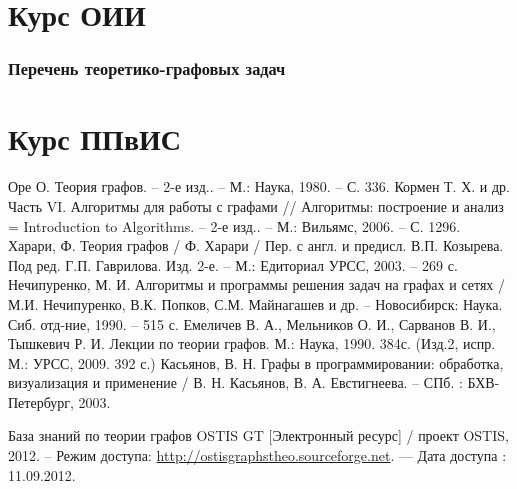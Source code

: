 \documentclass[a4paper,12pt]{report}
\begin{document}

\tableofcontents

\part{Курс ОИИ}


\clearpage

{}
\section*{Перечень теоретико-графовых задач}
\label{sec:tasks_list}






\part{Курс ППвИС}






\newpage 
\begin{thebibliography}{99}

 Оре О. Теория графов. -- 2-е изд.. -- М.: Наука,
  1980. -- С. 336.
 Кормен Т. Х. и др. Часть VI. Алгоритмы для
  работы с графами // Алгоритмы: построение и анализ = Introduction to
  Algorithms. -- 2-е изд.. -- М.: Вильямс, 2006. -- С. 1296.
 Харари, Ф. Теория графов / Ф. Харари / Пер. с
  англ. и предисл. В.П. Козырева. Под ред. Г.П. Гаврилова. Изд. 2-е. --
  М.: Едиториал УРСС, 2003. -- 269 с.
 Нечипуренко, М. И. Алгоритмы и программы
  решения задач на графах и сетях / М.И. Нечипуренко, В.К. Попков,
  С.М. Майнагашев и др. -- Новосибирск: Наука. Сиб. отд-ние, 1990. --
  515 с.
 Емеличев В. А., Мельников О. И., Сарванов
  В. И., Тышкевич Р. И. Лекции по теории графов. М.: Наука,
  1990. 384с. (Изд.2, испр. М.: УРСС, 2009. 392 с.)
 Касьянов, В. Н. Графы в программировании:
  обработка, визуализация и применение / В. Н. Касьянов,
  В. А. Евстигнеева. -- СПб. : БХВ-Петербург, 2003.

 База знаний по теории графов OSTIS GT [Электронный
  ресурс] / проект OSTIS, 2012. -- Режим доступа:
  \href{http://ostisgraphstheo.sourceforge.net}{http://ostisgraphstheo.sourceforge.net}. ---
  Дата доступа : 11.09.2012.

\end{thebibliography}
\end{document}
